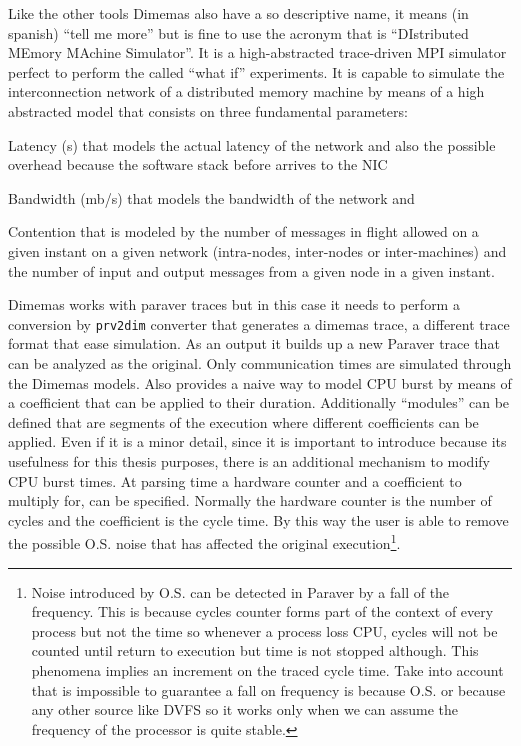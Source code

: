 Like the other tools Dimemas also have a so descriptive name, it means (in
spanish) ``tell me more'' but is fine to use the acronym that is ``DIstributed
MEmory MAchine Simulator''. It is a high-abstracted trace-driven MPI simulator
perfect to perform the called ``what if'' experiments. It is capable to simulate
the interconnection network of a distributed memory machine by means of a high
abstracted model that consists on three fundamental parameters:
\begin{enumerate*}[label=\roman*)]
  \item Latency (s) that models the actual latency of the network and also the
    possible overhead because the software stack before arrives to the NIC
  \item Bandwidth (mb/s) that models the bandwidth of the network and
  \item Contention that is modeled by the number of messages in flight 
    allowed on a given instant on a given network (intra-nodes, inter-nodes or
    inter-machines) and the number of input and output messages from a given
    node in a given instant.
\end{enumerate*}

Dimemas works with paraver traces but in this case it needs to perform a 
conversion by {\tt prv2dim} converter that generates a dimemas trace, a
different trace format that ease simulation.
As an output it builds up a
new Paraver trace that can be analyzed as the original. Only communication times 
are simulated through the Dimemas models. Also provides a naive way to model CPU
burst by means of a coefficient that can be applied to their duration.
Additionally ``modules'' can be defined that are segments of the execution where
different coefficients can be applied. Even if it is a minor detail, since it
is important to introduce because its usefulness for this thesis purposes,
there is an additional mechanism to modify CPU burst times. At parsing time
a hardware counter and a coefficient to multiply 
for, can be specified. Normally the hardware counter is the number of 
cycles and the coefficient is the cycle time. By this way the user is able to 
remove the possible O.S. noise that has affected the original
execution\footnote{Noise introduced by O.S. can be detected in Paraver by a fall 
  of the frequency. This is because cycles counter forms part of the context of
  every process but not the time so whenever a process loss CPU, cycles will not
  be counted until return to execution but time is not stopped although. This
  phenomena implies an increment on the traced cycle time. Take into account
  that is impossible to guarantee a fall on frequency is because O.S. or because
  any other source like DVFS so it works only when we can assume the frequency
of the processor is quite stable.}.


